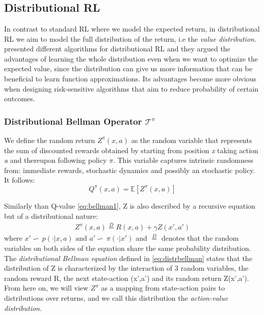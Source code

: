 \chapter{}\label{chap:appendix_distRL}
\section{Distributional RL} 

In contrast to standard RL where we model the expected return, in distributional RL we aim
to model the full distribution of the return, i.e the \textit{value distribution}.
\citet{Bellemare2017,Dabney2018a,Dabney2018b} presented different algorithms for distributional RL
and they argued the advantages of learning the whole distribution
even when we want to optimize the expected value, since the distribution can give us more information that
can be beneficial to learn function approximations.
Its advantages become more obvious when designing risk-sensitive algorithms that aim 
to reduce probability of
certain outcomes.

\subsection{Distributional Bellman Operator $\mathcal{T}^\pi$}

We define the random return $Z^\pi(x,a)$ as the random variable that represents the sum
of discounted rewards
obtained by 
starting from position \textit{x} taking action \textit{a} and thereupon following
policy $\pi$.
This variable captures intrinsic randomness from: immediate rewards, stochastic dynamics
and possibly an stochastic policy.
It follows:
\begin{equation}
    Q^\pi(x,a) = \mathbb E[Z^\pi(x,a)]
\end{equation}

Similarly than Q-value \ref{eq:bellman1}, Z is also described by a recursive equation
but of a distributional nature: 
\begin{eqnarray}
    Z^\pi(x,a) \stackrel{D}{=} R(x,a) + \gamma Z(x',a') \label{eq:distrbellman}
\end{eqnarray}
where $x'\backsim\ p(\cdot|x,a) \text{ and } a' \backsim\ \pi(\cdot |x')$ and $\stackrel{D}{=}$ 
denotes that the random variables on both sides of the equation share the same
probability distribution.\\
The \textit{distributional Bellman equation} defined in \eqref{eq:distrbellman} states
that the distribution of 
Z is characterized by the interaction of 3 random variables, the random reward R, the next
state-action (x',a') and its random return 
Z(x',a'). From here on, we will view $Z^\pi$ as a mapping from state-action pairs to
distributions over
returns, and we call this distribution the \textit{action-value distribution}.

